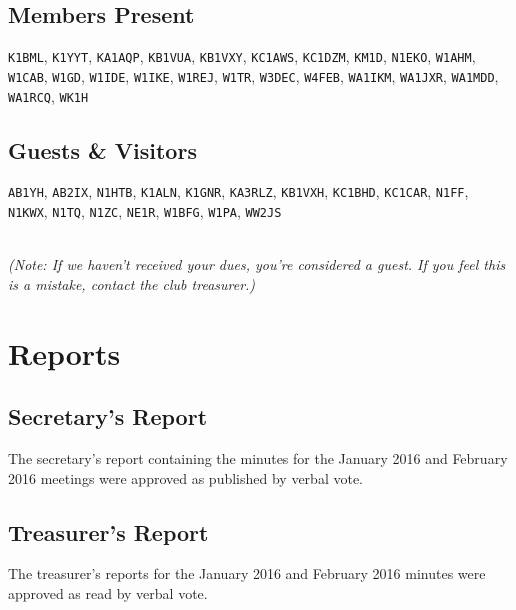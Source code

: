 \documentclass[10pt,letterpaper]{article}
\begin{document}
\subsection{Members Present}
\texttt{K1BML},
\texttt{K1YYT},
\texttt{KA1AQP},
\texttt{KB1VUA},
\texttt{KB1VXY},
\texttt{KC1AWS},
\texttt{KC1DZM},
\texttt{KM1D},
\texttt{N1EKO},
\texttt{W1AHM},
\texttt{W1CAB},
\texttt{W1GD},
\texttt{W1IDE},
\texttt{W1IKE},
\texttt{W1REJ},
\texttt{W1TR},
\texttt{W3DEC},
\texttt{W4FEB},
\texttt{WA1IKM},
\texttt{WA1JXR},
\texttt{WA1MDD},
\texttt{WA1RCQ},
\texttt{WK1H}


\subsection{Guests \& Visitors}
\texttt{AB1YH},
\texttt{AB2IX},
\texttt{N1HTB},
\texttt{K1ALN},
\texttt{K1GNR},
\texttt{KA3RLZ},
\texttt{KB1VXH},
\texttt{KC1BHD},
\texttt{KC1CAR},
\texttt{N1FF},
\texttt{N1KWX},
\texttt{N1TQ},
\texttt{N1ZC},
\texttt{NE1R},
\texttt{W1BFG},
\texttt{W1PA},
\texttt{WW2JS}

\noindent\\
\emph{(Note: If we haven't received your dues, you're considered a guest. If you feel this is a mistake, contact the club treasurer.)}

\section{Reports}

\subsection{Secretary's Report}

The secretary's report containing the minutes for the January 2016 and February 2016 meetings were  approved as published by verbal vote.

\newpage
\subsection{Treasurer's Report}

The treasurer's reports for the January 2016 and February 2016 minutes were approved as read by verbal vote.
\end{document}
